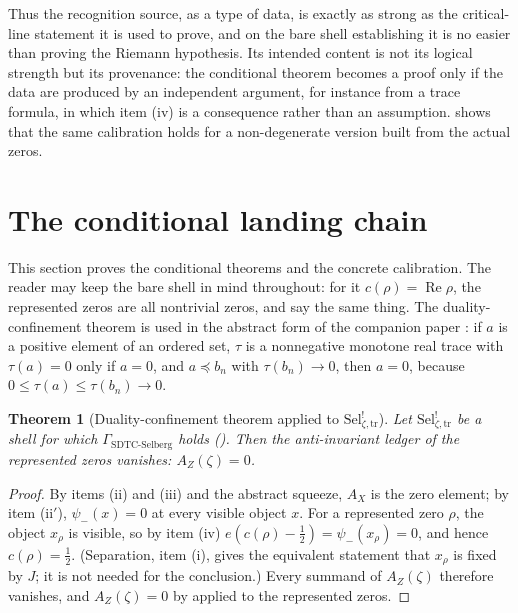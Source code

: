 \documentclass[11pt]{article}
\DeclareMathOperator{\Real}{Re}
\newcommand{\AZ}{A_{Z}(\zeta)}
\newcommand{\Sel}{\mathrm{Sel}^{!}_{\zeta,\mathrm{tr}}}
\newcommand{\GamSDTCSelberg}{\Gamma_{\mathrm{SDTC\text{-}Selberg}}}
\newcommand{\psim}{\psi_{-}}
\newcommand{\AX}{A_{X}}
\newtheorem{theorem}{Theorem}[section]
\theoremstyle{definition}
\begin{document}
Thus the recognition source, as a type of data, is exactly as strong as
the critical-line statement it is used to prove, and on the bare shell
establishing it is no easier than proving the Riemann
hypothesis.  Its intended content is not its logical
strength but its provenance: the conditional theorem becomes a proof
only if the data are produced by an independent argument, for instance
from a trace formula, in which item (iv) is a consequence rather than
an assumption.   shows that the same
calibration holds for a non-degenerate version built from the actual
zeros.
 \section{The conditional landing chain}
\label{sec:landing_chain}

This section proves the conditional theorems and the concrete
calibration.  The reader may keep the bare shell in mind throughout: for
it \(c(\rho)=\Real\rho\), the represented zeros are all nontrivial
zeros, and  say the same
thing.  The duality-confinement theorem is used in the abstract
form of the companion paper \citep[Remark~7.2]{TsiokosSDTC2026}: if
\(a\) is a positive element of an ordered set, \(\tau\) is a
nonnegative monotone real trace with \(\tau(a)=0\) only if \(a=0\), and
\(a\preceq b_n\) with \(\tau(b_n)\to0\), then \(a=0\), because
\(0\leq\tau(a)\leq\tau(b_n)\to0\).

\begin{theorem}[Duality-confinement theorem applied to \(\Sel\)]
\label{thm:rh:dc-master-applied}
Let \(\Sel\) be a shell for which \(\GamSDTCSelberg\) holds
().  Then the
anti-invariant ledger of the represented zeros vanishes: \(\AZ=0\).
\end{theorem}

\begin{proof}
By items (ii) and (iii) and the abstract squeeze, \(\AX\) is the zero
element; by item (ii\('\)), \(\psim(x)=0\) at every visible object \(x\).
For a represented zero \(\rho\), the object \(x_\rho\) is visible, so
by item (iv) \(e(c(\rho)-\frac12)=\psim(x_\rho)=0\), and
hence \(c(\rho)=\frac12\).  (Separation, item (i), gives the equivalent
statement that \(x_\rho\) is fixed by \(J\); it is not needed for the
conclusion.)  Every summand of \(\AZ\) therefore vanishes, and
\(\AZ=0\) by  applied to the represented zeros.
\end{proof}
\end{document}
